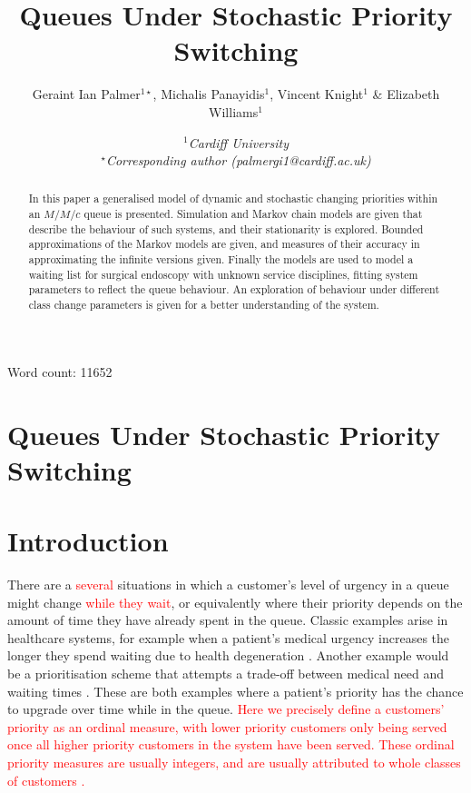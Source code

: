 \documentclass{article}
\title{\bf Queues Under Stochastic Priority Switching}
\author{Geraint Ian Palmer$^{1\star}$, Michalis Panayidis$^1$, Vincent Knight$^1$ \& Elizabeth Williams$^1$}
\date{\it $^1$Cardiff University \\ $^\star$Corresponding author (palmergi1@cardiff.ac.uk)}
\begin{document}
\maketitle

Word count: 11652

\newpage

\section*{\centering Queues Under Stochastic Priority Switching}

\begin{abstract}
In this paper a generalised model of dynamic and stochastic changing priorities
within an $M/M/c$ queue is presented. Simulation and Markov chain models are
given that describe the behaviour of such systems, and their stationarity is
explored.
Bounded approximations of the Markov models are given, and measures of their
accuracy in approximating the infinite versions given. Finally the models are
used to model a waiting list for surgical endoscopy with unknown service
disciplines, fitting system parameters to reflect the queue behaviour. An
exploration of behaviour under different class change parameters is given for a
better understanding of the system. 
\end{abstract}

\section{Introduction}


There are a \textcolor{red}{several} situations in which a customer's level of
urgency in a queue might change \textcolor{red}{while they wait}, or
equivalently where their priority depends on the amount of time they have
already spent in the queue.
Classic examples arise in healthcare systems, for example when a patient's
medical urgency increases the longer they spend waiting due to health
degeneration \cite{williams20, garbuzetal06, delongetal08}. Another example
would be a prioritisation scheme that attempts a trade-off between medical need
and waiting times \cite{powersetal23}.
These are both examples where a patient's priority has the chance to upgrade
over time while in the queue.
\textcolor{red}{Here we precisely define a customers' priority as an
ordinal measure, with lower priority customers only being served once all higher
priority customers in the system have been served. These ordinal priority
measures are usually integers, and are usually attributed to whole classes of
customers \cite{stewart09}.}
\end{document}

